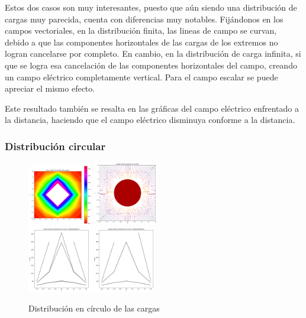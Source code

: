 \documentclass[11pt]{article}
\begin{document}
    \vspace{5mm} Estos dos casos son muy interesantes, puesto que aún siendo una distribución de cargas muy parecida, cuenta con diferencias muy notables. Fijándonos en los campos vectoriales, en la distribución finita, las lineas de campo se curvan, debido a que las componentes horizontales de las cargas de los extremos no logran cancelarse por completo. En cambio, en la distribución de carga infinita, si que se logra esa cancelación de las componentes horizontales del campo, creando un campo eléctrico completamente vertical. Para el campo escalar se puede apreciar el mismo efecto.


    \vspace{5mm} Este resultado también se resalta en las gráficas del campo eléctrico enfrentado a la distancia, haciendo que el campo eléctrico disminuya conforme a la distancia.

    \clearpage 

\subsubsection{Distribución circular}

    \begin{figure}[h]
        \includegraphics[width=0.25\textwidth]{circulo2.png}
        \includegraphics[width=0.25\textwidth]{circulo3.png}
        \includegraphics[width=0.5\textwidth]{circulo1.png}
        \caption{Distribución en círculo de las cargas}
    \end{figure}
\end{document}

